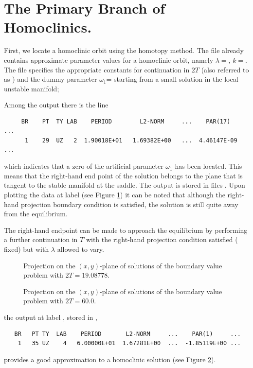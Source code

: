 \documentclass[12pt]{report}
\begin{document}
\section{The Primary Branch of Homoclinics.}
First, we locate a homoclinic orbit using 
the homotopy method. The file  
already contains 
approximate parameter values for a homoclinic orbit, 
namely $\lambda=$, $k=$. 
The file  specifies the appropriate
constants for continuation in $2T$ (also referred
to as ) and the dummy parameter $\omega_1$=
starting
from a small solution in the local unstable manifold; 
\begin{center}
\end{center}
Among the output there is the line
\begin{verbatim}
     BR    PT  TY LAB    PERIOD        L2-NORM     ...    PAR(17)    ...
      1    29  UZ   2  1.90018E+01   1.69382E+00   ...  4.46147E-09  ...
\end{verbatim}
which indicates that a zero of the artificial parameter $\omega_1$
has been located. This means that the right-hand end point of the solution
belongs to the plane that is tangent to the stable manifold at the saddle. 
The output is stored in files . 
Upon plotting the data at label  (see Figure \ref{kf.1a})
it can be noted that although the right-hand projection boundary
condition is satisfied, the solution is still quite away from the
equilibrium. 

The right-hand endpoint can be made to approach the
equilibrium by performing a further continuation in $T$ with the
right-hand projection condition satisfied ( fixed) but
with $\lambda$ allowed to vary. 
%
\begin{figure}[p]
\epsfysize 9.0cm
\centerline{}
\caption{Projection on the $(x,y)$-plane of solutions 
of the boundary value 
problem with $2T=19.08778$.}
\label{kf.1a}
\end{figure}
\begin{figure}[p]
\epsfysize 9.0cm
\centerline{}
\caption{Projection on the $(x,y)$-plane of solutions of the 
boundary value problem with $2T = 60.0$.}
\label{kf.1b}
\end{figure}
%
\begin{center}
\end{center}
the output at label , stored in ,
\begin{verbatim}
   BR   PT TY  LAB    PERIOD       L2-NORM     ...    PAR(1)     ...
    1   35 UZ    4   6.00000E+01  1.67281E+00  ...  -1.85119E+00 ...
\end{verbatim}
provides a good approximation to a homoclinic solution (see Figure
\ref{kf.1b}). 
\end{document}
